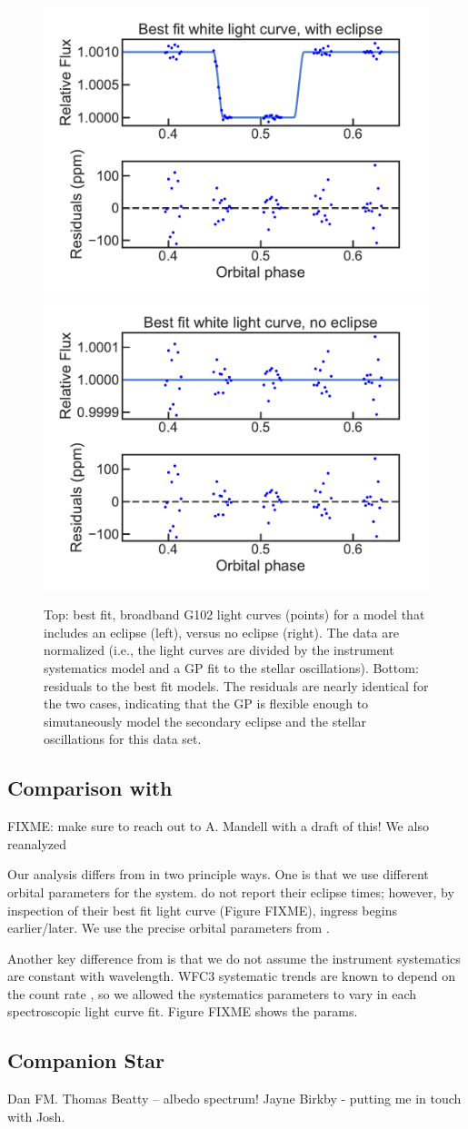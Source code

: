 \documentclass[twocolumn]{aastex62}
\begin{document}
\begin{figure}
\includegraphics[width = 0.5 \textwidth]{figures/eclipse.pdf}
\includegraphics[width = 0.5 \textwidth]{figures/no_eclipse.pdf}
\caption{Top: best fit, broadband G102 light curves (points) for a model that includes an eclipse (left), versus no eclipse (right). The data are normalized (i.e., the light curves are divided by the instrument systematics model and a GP fit to the stellar oscillations). Bottom: residuals to the best fit models. The residuals are nearly identical for the two cases, indicating that the GP is flexible enough to simutaneously model the secondary eclipse and the stellar oscillations for this data set.} 
\label{fig:GP}
\end{figure}

\subsection{Comparison with \cite{haynes15}}
FIXME: make sure to reach out to A. Mandell with a draft of this!
We also reanalyzed 

Our analysis differs from \cite{haynes15} in two principle ways. One is that we use different orbital parameters for the system. \cite{haynes15} do not report their eclipse times; however, by inspection of their best fit light curve (Figure FIXME), ingress begins earlier/later. We use the precise orbital parameters from \cite{zhang17}.

Another key difference from \cite{haynes15} is that we do not assume the instrument systematics are constant with wavelength. WFC3 systematic trends are known to depend on the count rate \cite{zhou17}, so we allowed the systematics parameters to vary in each spectroscopic light curve fit.  Figure FIXME shows the params.


\subsection{Companion Star}

\acknowledgments
Dan FM. Thomas Beatty -- albedo spectrum! Jayne Birkby - putting me in touch with Josh.



\end{document}

